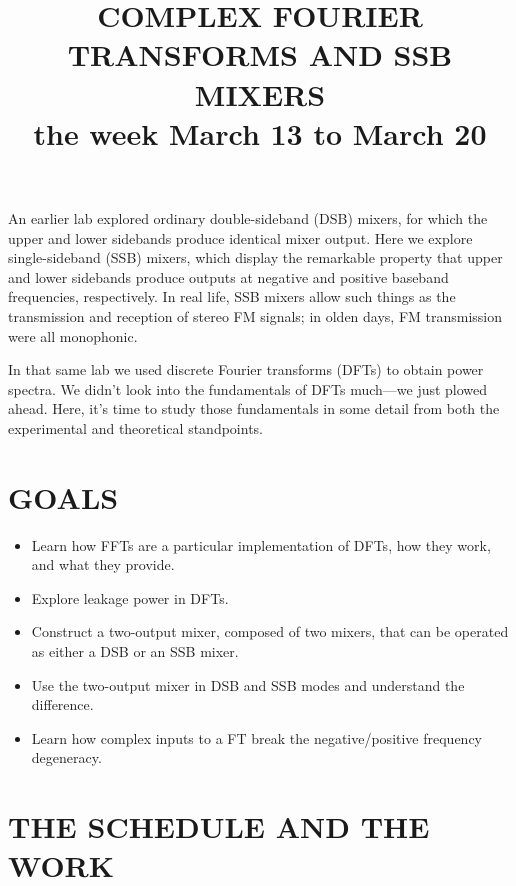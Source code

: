 \documentclass[11pt,preprint]{aastex}
\begin{document}
\def\simlt{\lower.5ex\hbox{$\; \buildrel < \over \sim \;$}}
\def\simgt{\lower.5ex\hbox{$\; \buildrel > \over \sim \;$}}


\title {COMPLEX FOURIER TRANSFORMS AND SSB MIXERS \\
the week March 13 to March 20}

An earlier lab explored ordinary double-sideband (DSB) mixers, for which
the upper and lower sidebands produce identical mixer output. Here we
explore single-sideband (SSB) mixers, which display the remarkable
property that upper and lower sidebands produce outputs at negative and
positive baseband frequencies, respectively. In real life, SSB mixers
allow such things as the transmission and reception of stereo FM
signals; in olden days, FM transmission were all monophonic.

In that same lab we used discrete Fourier transforms (DFTs) to obtain
power spectra. We didn't look into the fundamentals of DFTs much---we
just plowed ahead. Here, it's time to study those fundamentals in some
detail from both the experimental and theoretical standpoints.

\section{GOALS}

\begin{itemize}

\item Learn how FFTs are a particular implementation of DFTs, how they
work, and what they provide.

\item Explore leakage power in DFTs.

\item Construct a two-output mixer, composed of two mixers, that can be
  operated as either a DSB or an SSB mixer. 

\item Use the two-output mixer in DSB and SSB modes and understand the
  difference. 

\item Learn how complex inputs to a FT break the negative/positive
  frequency degeneracy.

\end{itemize}


\section{THE SCHEDULE AND THE WORK}
\end{document}
